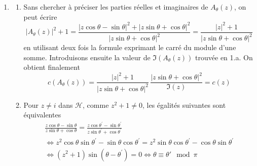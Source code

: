 \begin{enumerate}
\item
 \begin{enumerate}
 \item  Sans chercher {\`a} pr{\'e}ciser les parties r{\'e}elles et imaginaires de $A_\theta (z)$, on peut {\'e}crire
\begin{displaymath}
 |A_\theta (z)|^2+1 = 
\frac{|z\cos\theta-\sin\theta|^2+|z\sin\theta+\cos\theta|^2}
     {|z\sin\theta+\cos\theta|^2}=\frac{|z|^2+1}{|z\sin\theta+\cos\theta|^2}
\end{displaymath}
en utilisant deux fois la formule exprimant le carré du module d'une somme. 
Introduisons ensuite la valeur de $\Im (A_\theta (z))$ trouv{\'e}e en 1.a. On obtient finalement
\begin{displaymath}
 c(A_\theta (z))= \frac{|z|^2+1}{|z\sin\theta+\cos\theta|^2} \, \frac{|z\sin\theta+\cos\theta|^2}{\Im (z)} = c(z)
\end{displaymath}
\item Pour $z\neq i$ dans $\mathcal{H}$, comme $z^2+1\neq0$, les {\'e}galit{\'e}s suivantes sont {\'e}quivalentes
\begin{multline*}
\frac{z\cos\theta-\sin\theta}{z\sin\theta+\cos\theta} = 
     \frac{z\cos\theta^{\prime}-\sin\theta^{\prime}}{z\sin\theta^{\prime}+\cos\theta^{\prime}}\\
\Leftrightarrow    z^2\cos \theta \sin \theta^{\prime}-\sin \theta \cos \theta^{\prime} =
    z^2\sin \theta \cos \theta^{\prime}-\cos \theta \sin \theta^{\prime} \\
\Leftrightarrow    (z^2+1) \sin(\theta - \theta^{\prime}) = 0
\Leftrightarrow \theta \equiv \theta' \mod \pi
\end{multline*}
   \end{enumerate}


\end{enumerate}
